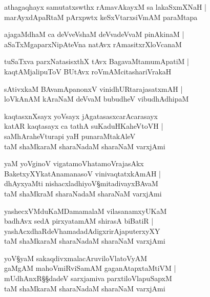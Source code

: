 \begin{shloka}
athagaqhayx samutatxswthx rAmavAkayxM sa lakaSxmXNaH |\\
marAyxdApaRtaM pArxpwtx keSxVtarxsiVmAM paraMtapa
\end{shloka}

\begin{shloka}
ajagaMdhaM ca deVveVshaM deVvadeVvaM pinAkinaM |\\
aSaTxMgaparxNipAteVna natAvx rAmasitxrXloVcanaM 
\end{shloka}

\begin{shloka}
tuSaTxva parxNatasisxthX tAvx BagavaMtamumApatiM |\\
kaqtAMjalipuToV BUtAvx roVmAMcitashariVrakaH 
\end{shloka}

\begin{shloka}
sAtivxkaM BAvamApanonxV vinidhURtarajasatxmAH |\\
loVkAnAM kAraNaM deVvaM bubudheV vibudhAdhipaM
\end{shloka}

\begin{shloka}
kaqtasxnXsayx yoVsayx jAgatasasxcarAcarasayx\\
katAR kaqtasayx ca tathA suKaduHKaheVtoVH |\\
saMhAraheVturapi yaH punaraMtakAleV\\
taM shaMkaraM sharaNadaM sharaNaM varxjAmi
\end{shloka}

\begin{shloka}
yaM yoVginoV vigatamoVhatamoVrajasAkx\\
BaketxyXYkatAnamanasoV vinivaqtatxkAmAH |\\
dhAyxyaMti nishacxladhiyoV\S mitadivayxBAvaM\\
taM shaMkraM sharaNadaM sharaNaM varxjAmi
\end{shloka}

\begin{shloka}
yashecxVMduKaMDamamalaM vilasanamxyUKaM\\
badhAvx sedA pirxyatamAM shirasA biBatiR |\\
yashAcxdhaRdeVhamadadAdigxrirAjaputerxyXY\\
taM shaMkaraM sharaNadaM sharaNaM varxjAmi
\end{shloka}

\begin{shloka}
yoV\S yaM sakaqdivxmalacAruviloVlatoVyAM\\
gaMgAM mahoVmiRviSamAM gaganAtapxtaMtiVM |\\
mUdhAnxR\S\S dadeV sarxjamiva parxtiloVlapuSapxM\\
taM shaMkaraM sharaNadaM sharaNaM varxjAmi
\end{shloka}

